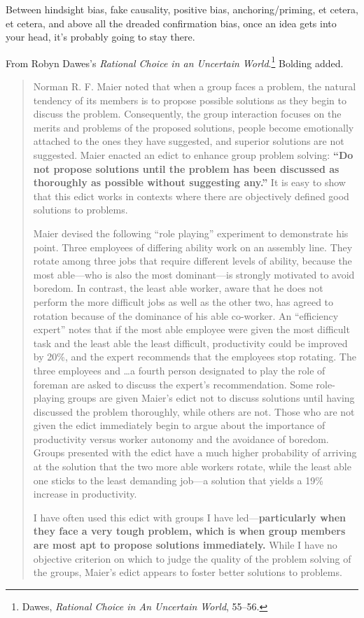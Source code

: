 {
 Between hindsight bias, fake causality, positive bias,
anchoring/priming, et cetera, et cetera, and above all the dreaded
confirmation bias, once an idea gets into your head,
it's probably going to stay there.}

\myendsectiontext


\bigskip


{
 From Robyn Dawes's \textit{Rational Choice in an
Uncertain World}.\footnote{Dawes, \textit{Rational Choice in An Uncertain World}, 55--56.} Bolding added.}

\begin{quotation}
{
 Norman R. F. Maier noted that when a group faces a problem, the
natural tendency of its members is to propose possible solutions as
they begin to discuss the problem. Consequently, the group interaction
focuses on the merits and problems of the proposed solutions, people
become emotionally attached to the ones they have suggested, and
superior solutions are not suggested. Maier enacted an edict to enhance
group problem solving: \textbf{``Do not propose
solutions until the problem has been discussed as thoroughly as
possible without suggesting any.''} It is easy to
show that this edict works in contexts where there are objectively
defined good solutions to problems.}

{
 Maier devised the following ``role
playing'' experiment to demonstrate his point. Three
employees of differing ability work on an assembly line. They rotate
among three jobs that require different levels of ability, because the
most able---who is also the most dominant---is strongly motivated to
avoid boredom. In contrast, the least able worker, aware that he does
not perform the more difficult jobs as well as the other two, has
agreed to rotation because of the dominance of his able co-worker. An
``efficiency expert'' notes that if
the most able employee were given the most difficult task and the least
able the least difficult, productivity could be improved by 20\%, and
the expert recommends that the employees stop rotating. The three
employees and \ldots a fourth person designated to play the role of
foreman are asked to discuss the expert's
recommendation. Some role-playing groups are given
Maier's edict not to discuss solutions until having
discussed the problem thoroughly, while others are not. Those who are
not given the edict immediately begin to argue about the importance of
productivity versus worker autonomy and the avoidance of boredom.
Groups presented with the edict have a much higher probability of
arriving at the solution that the two more able workers rotate, while
the least able one sticks to the least demanding job---a solution that
yields a 19\% increase in productivity.}

{
 I have often used this edict with groups I have
led---\textbf{particularly when they face a very tough problem, which
is when group members are most apt to propose solutions immediately.}
While I have no objective criterion on which to judge the quality of
the problem solving of the groups, Maier's edict
appears to foster better solutions to problems.}
\end{quotation}

